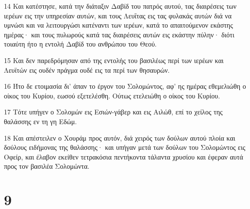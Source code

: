\par 14 Και κατέστησε, κατά την διάταξιν Δαβίδ του πατρός αυτού, τας διαιρέσεις των ιερέων εις την υπηρεσίαν αυτών, και τους Λευΐτας εις τας φυλακάς αυτών διά να υμνώσι και να λειτουργώσι κατέναντι των ιερέων, κατά το απαιτούμενον εκάστης ημέρας· και τους πυλωρούς κατά τας διαιρέσεις αυτών εις εκάστην πύλην· διότι τοιαύτη ήτο η εντολή Δαβίδ του ανθρώπου του Θεού.
\par 15 Και δεν παρεδρόμησαν από της εντολής του βασιλέως περί των ιερέων και Λευϊτών εις ουδέν πράγμα ουδέ εις τα περί των θησαυρών.
\par 16 Ήτο δε ετοιμασία δι' άπαν το έργον του Σολομώντος, αφ' ης ημέρας εθεμελιώθη ο οίκος του Κυρίου, εωσού εξετελέσθη. Ούτως ετελειώθη ο οίκος του Κυρίου.
\par 17 Τότε υπήγεν ο Σολομών εις Εσιών-γάβερ και εις Αιλώθ, επί το χείλος της θαλάσσης εν τη γη Εδώμ.
\par 18 Και απέστειλεν ο Χουράμ προς αυτόν, διά χειρός των δούλων αυτού πλοία και δούλους ειδήμονας της θαλάσσης· και υπήγαν μετά των δούλων του Σολομώντος εις Οφείρ, και έλαβον εκείθεν τετρακόσια πεντήκοντα τάλαντα χρυσίου και έφεραν αυτά προς τον βασιλέα Σολομώντα.

\chapter{9}

